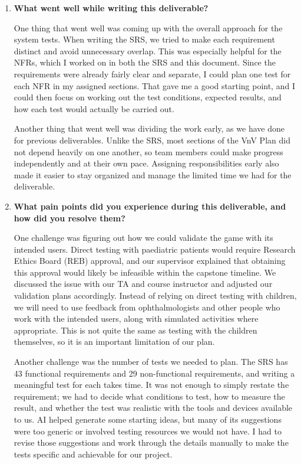 \documentclass[10pt,titlepage]{article}
\begin{document}
\begin{enumerate}
    \item \textbf{What went well while writing this deliverable?}

    One thing that went well was coming up with the overall approach for the
    system tests. When writing the SRS, we tried to make each requirement distinct
    and avoid unnecessary overlap. This was especially helpful for the NFRs,
    which I worked on in both the SRS and this document. Since the requirements
    were already fairly clear and separate, I could plan one test for each NFR
    in my assigned sections. That gave me a good starting point, and I could
    then focus on working out the test conditions, expected results, and how
    each test would actually be carried out.

    Another thing that went well was dividing the work early, as we have done
    for previous deliverables. Unlike the SRS, most sections of the VnV Plan
    did not depend heavily on one another, so team members could make progress
    independently and at their own pace. Assigning responsibilities early also
    made it easier to stay organized and manage the limited time we had for
    the deliverable.

    \item \textbf{What pain points did you experience during this
    deliverable, and how did you resolve them?}

    One challenge was figuring out how we could validate the game with its
    intended users. Direct testing with paediatric patients would require
    Research Ethics Board (REB) approval, and our supervisor explained that
    obtaining this approval would likely be infeasible within the capstone
    timeline. We discussed the issue with our TA and course instructor and
    adjusted our validation plans accordingly. Instead of relying on direct
    testing with children, we will need to use feedback from ophthalmologists
    and other people who work with the intended users, along with simulated
    activities where appropriate. This is not quite the same as testing with
    the children themselves, so it is an important limitation of our plan.

    Another challenge was the number of tests we needed to plan. The SRS has
    43 functional requirements and 29 non-functional requirements, and writing
    a meaningful test for each takes time. It was not enough to simply restate
    the requirement; we had to decide what conditions to test, how to measure
    the result, and whether the test was realistic with the tools and devices
    available to us. AI helped generate some starting ideas, but many of its
    suggestions were too generic or involved testing resources we would not
    have. I had to revise those suggestions and work through the details
    manually to make the tests specific and achievable for our project.


\end{enumerate}
\end{document}
